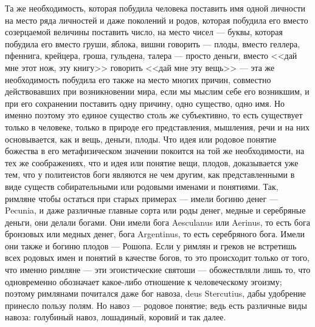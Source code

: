 \documentclass[12pt]{article}
\begin{document}
Та же необходимость, которая побудила человека поставить имя одной личности на место ряда личностей и даже поколений и родов, которая побудила его вместо созерцаемой величины поставить число, на место чисел --- буквы, которая побудила его вместо груши, яблока, вишни говорить --- плоды, вместо геллера, пфеннига, крейцера, гроша, гульдена, талера --- просто деньги, вместо <<дай мне этот нож, эту книгу>> говорить <<дай мне эту вещь>>  --- эта же необходимость побудила его также на место многих причин, совместно действовавших при возникновении мира, если мы мыслим себе его возникшим, и при его сохранении поставить одну причину, одно существо, одно имя. Но именно поэтому это единое существо столь же субъективно, то есть существует только в человеке, только в природе его представления, мышления, речи и на них основывается, как и вещь, деньги, плоды. Что идея или родовое понятие божества в его метафизическом значении покоится на той же необходимости, на тех же соображениях, что и идея или понятие вещи, плодов, доказывается уже тем, что у политеистов боги являются не чем другим, как представленными в виде существ собирательными или родовыми именами и понятиями. Так, римляне чтобы остаться при старых примерах --- имели богиню денег --- Pecunia, и даже различные главные сорта или роды денег, медные и серебряные деньги, они делали богами. Они имели бога Aesculanus или Aerinus, то есть бога бронзовых или медных денег, бога Argentinus, то есть серебряного бога. Имели они также и богиню плодов --- Рошопа. Если у римлян и греков не встретишь всех родовых имен и понятий в качестве богов, то это происходит только от того, что именно римляне --- эти эгоистические святоши --- обожествляли лишь то, что одновременно обозначает какое-либо отношение к человеческому эгоизму; поэтому римлянами почитался даже бог навоза, deus Stercutius, дабы удобрение принесло пользу полям. Но навоз --- родовое понятие; ведь есть различные виды навоза: голубиный навоз, лошадиный, коровий и так далее.
\end{document}
